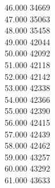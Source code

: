 { 46.000	34669 \\
 47.000	35063 \\
 48.000	35458 \\
 49.000	42044 \\
 50.000	42092 \\
 51.000	42118 \\
 52.000	42142 \\
 53.000	42338 \\
 54.000	42366 \\
 55.000	42390 \\
 56.000	42415 \\
 57.000	42439 \\
 58.000	42462 \\
 59.000	43257 \\
 60.000	43292 \\
 61.000	43633 \\
}
